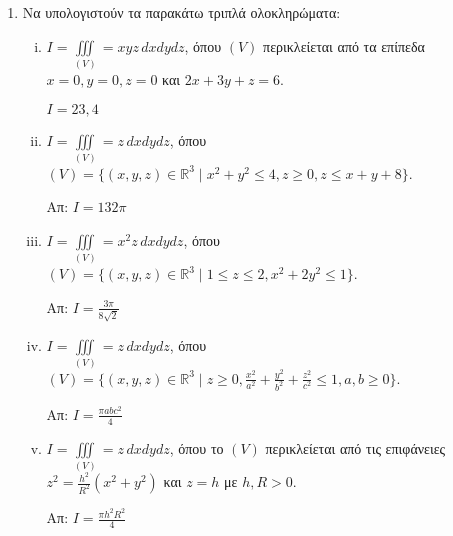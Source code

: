 



\everymath{\displaystyle}
\thispagestyle{empty}





\begin{center}
\end{center}

\vspace{\baselineskip}

\begin{enumerate}
  \item Να υπολογιστούν τα παρακάτω τριπλά ολοκληρώματα:
  \begin{enumerate}[i)]
    \item $I=\iiint\limits_{(V)}=xyz\,dxdydz$, όπου $(V)$ περικλείεται από τα επίπεδα $x=0, y=0, z=0$ και $2x+3y+z=6$.

    \hfill $I=23,4$

    \item $I=\iiint\limits_{(V)}=z\,dxdydz$, όπου $(V)=\{(x,y,z)\in \mathbb{R}^{3} \mid x^{2}+y^{2}\leq 4, z\geq 0, z\leq x+y+8\}$.

    \hfill Απ: $I=132\pi$

    \item $I=\iiint\limits_{(V)}=x^{2}z\,dxdydz$, όπου $(V)=\{(x,y,z)\in \mathbb{R}^{3} \mid 1\leq z\leq 2, x^{2}+2y^{2}\leq 1\}$.

    \hfill Απ: $I=\frac{3\pi}{8\sqrt{2}}$

    \item $I=\iiint\limits_{(V)}=z\,dxdydz$, όπου $(V)=\{(x,y,z)\in \mathbb{R}^{3} \mid z\geq 0, \frac{x^{2}}{a^{2}}+\frac{y^{2}}{b^{2}}+\frac{z^{2}}{c^{2}}\leq 1, a,b\geq 0\}$.

    \hfill Απ: $I=\frac{\pi abc^{2}}{4}$

    \item $I=\iiint\limits_{(V)}=z\,dxdydz$, όπου το $(V)$ περικλείεται από τις επιφάνειες $z^{2}=\frac{h^{2}}{R^{2}}(x^{2}+y^{2})$ και $z=h$ με $h,R>0$.

    \hfill Απ: $I=\frac{\pi h^{2}R^{2}}{4}$
  \end{enumerate}
\end{enumerate}



